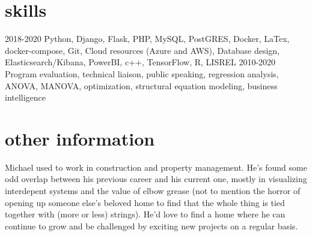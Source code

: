 \documentclass[]{twentysecondcv}
\begin{document}
\section{skills}
	\begin{twentyshort}
	\twentyitemshort
	{2018-2020}
	{Python, Django, Flask, PHP, MySQL, PostGRES, Docker, LaTex, docker-compose, Git, Cloud resources (Azure and AWS), Database design, Elasticsearch/Kibana, PowerBI, c++, TensorFlow, R, LISREL}
	\twentyitemshort
	{2010-2020}
	{Program evaluation, technical liaison, public speaking, regression analysis, ANOVA, MANOVA, optimization, structural equation modeling, business intelligence}
	\end{twentyshort}
\section{other information}
Michael used to work in construction and property management. He's found some odd overlap between his previous career and his current one, mostly in visualizing interdepent systems and the value of elbow grease (not to mention the horror of opening up someone else's beloved home to find that the whole thing is tied together with (more or less) strings). He'd love to find a home where he can continue to grow and be challenged by exciting new projects on a regular basis.

\end{document}
